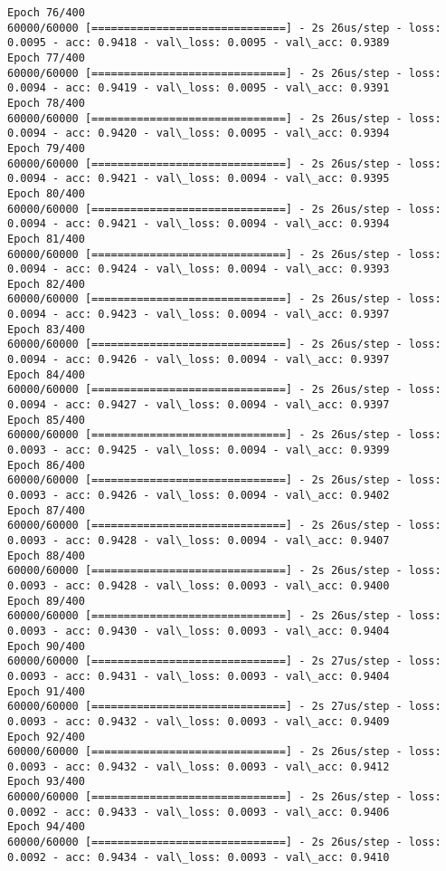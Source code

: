 \documentclass[11pt]{article}
\begin{document}
\begin{Verbatim}[commandchars=\\\{\}]
Epoch 76/400
60000/60000 [==============================] - 2s 26us/step - loss: 0.0095 - acc: 0.9418 - val\_loss: 0.0095 - val\_acc: 0.9389
Epoch 77/400
60000/60000 [==============================] - 2s 26us/step - loss: 0.0094 - acc: 0.9419 - val\_loss: 0.0095 - val\_acc: 0.9391
Epoch 78/400
60000/60000 [==============================] - 2s 26us/step - loss: 0.0094 - acc: 0.9420 - val\_loss: 0.0095 - val\_acc: 0.9394
Epoch 79/400
60000/60000 [==============================] - 2s 26us/step - loss: 0.0094 - acc: 0.9421 - val\_loss: 0.0094 - val\_acc: 0.9395
Epoch 80/400
60000/60000 [==============================] - 2s 26us/step - loss: 0.0094 - acc: 0.9421 - val\_loss: 0.0094 - val\_acc: 0.9394
Epoch 81/400
60000/60000 [==============================] - 2s 26us/step - loss: 0.0094 - acc: 0.9424 - val\_loss: 0.0094 - val\_acc: 0.9393
Epoch 82/400
60000/60000 [==============================] - 2s 26us/step - loss: 0.0094 - acc: 0.9423 - val\_loss: 0.0094 - val\_acc: 0.9397
Epoch 83/400
60000/60000 [==============================] - 2s 26us/step - loss: 0.0094 - acc: 0.9426 - val\_loss: 0.0094 - val\_acc: 0.9397
Epoch 84/400
60000/60000 [==============================] - 2s 26us/step - loss: 0.0094 - acc: 0.9427 - val\_loss: 0.0094 - val\_acc: 0.9397
Epoch 85/400
60000/60000 [==============================] - 2s 26us/step - loss: 0.0093 - acc: 0.9425 - val\_loss: 0.0094 - val\_acc: 0.9399
Epoch 86/400
60000/60000 [==============================] - 2s 26us/step - loss: 0.0093 - acc: 0.9426 - val\_loss: 0.0094 - val\_acc: 0.9402
Epoch 87/400
60000/60000 [==============================] - 2s 26us/step - loss: 0.0093 - acc: 0.9428 - val\_loss: 0.0094 - val\_acc: 0.9407
Epoch 88/400
60000/60000 [==============================] - 2s 26us/step - loss: 0.0093 - acc: 0.9428 - val\_loss: 0.0093 - val\_acc: 0.9400
Epoch 89/400
60000/60000 [==============================] - 2s 26us/step - loss: 0.0093 - acc: 0.9430 - val\_loss: 0.0093 - val\_acc: 0.9404
Epoch 90/400
60000/60000 [==============================] - 2s 27us/step - loss: 0.0093 - acc: 0.9431 - val\_loss: 0.0093 - val\_acc: 0.9404
Epoch 91/400
60000/60000 [==============================] - 2s 27us/step - loss: 0.0093 - acc: 0.9432 - val\_loss: 0.0093 - val\_acc: 0.9409
Epoch 92/400
60000/60000 [==============================] - 2s 26us/step - loss: 0.0093 - acc: 0.9432 - val\_loss: 0.0093 - val\_acc: 0.9412
Epoch 93/400
60000/60000 [==============================] - 2s 26us/step - loss: 0.0092 - acc: 0.9433 - val\_loss: 0.0093 - val\_acc: 0.9406
Epoch 94/400
60000/60000 [==============================] - 2s 26us/step - loss: 0.0092 - acc: 0.9434 - val\_loss: 0.0093 - val\_acc: 0.9410

\end{Verbatim}
\end{document}
